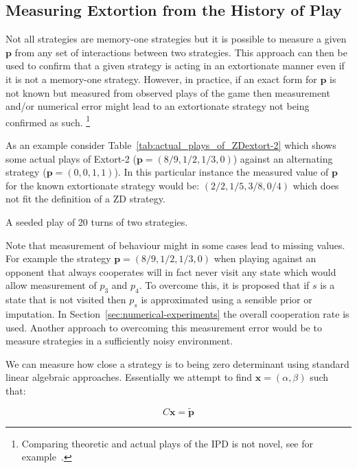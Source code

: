 \documentclass[a4paper]{article}
\begin{document}
\subsection{Measuring Extortion from the History of Play}

Not all strategies are memory-one strategies but it is possible to
measure a given \(\textbf{p}\) from any set of interactions between two strategies.
This approach can then be used to confirm that a given strategy is acting
in an extortionate manner even if it is not a memory-one strategy. However, in
practice, if an exact form for \(\textbf{p}\) is not known but measured from observed
plays of the game then measurement and/or numerical error might lead to an
extortionate strategy not being confirmed as such. \footnote{Comparing theoretic
and actual plays of the IPD is not novel, see for example~\cite{Rand2013}.}


As an example consider Table~\ref{tab:actual_plays_of_ZDextort-2} which shows
some actual plays of Extort-2 (\(\textbf{p}=(8 / 9, 1 / 2, 1 / 3, 0)\)) against an
alternating strategy (\(\textbf{p}=(0, 0, 1, 1)\)). In this particular instance the
measured value of \(\textbf{p}\) for the known extortionate strategy would be:
\((2/2, 1/5, 3/8, 0/4)\) which does not fit the definition of a ZD strategy.


\begin{table}[!hbtp]
    
    \caption{A seeded play of 20 turns of two strategies.}
    \label{tab:actual_plays_of_ZDextort-2}
\end{table}


Note that measurement of behaviour might in some cases lead to missing values.
For example the strategy \(\textbf{p}=(8 / 9, 1 / 2, 1 / 3, 0)\) when playing against an
opponent that always cooperates will in fact never visit any state which would allow measurement
of \(p_3\) and \(p_4\). To overcome this, it is proposed that if \(s\) is a state
that is not visited then \(p_s\) is approximated using a sensible prior or
imputation. In Section~\ref{sec:numerical-experiments} the overall cooperation
rate is used. Another approach to overcoming this measurement error would be to
measure strategies in a sufficiently noisy environment.

We can measure how close a strategy is to being zero determinant using standard
linear algebraic approaches. Essentially we attempt to find \(\textbf{x}=(\alpha,
\beta)\) such that:

\begin{equation}\label{eqn:linear_algebraic_equation_for_p}
    C\textbf{x}= \tilde{\textbf{p}}
\end{equation}
\end{document}
